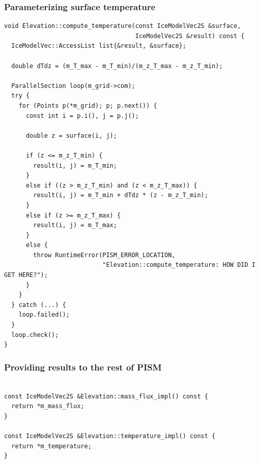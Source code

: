 \documentclass[hide notes,intlimits]{beamer}
\begin{document}
\begin{frame}[fragile]
  \frametitle{Parameterizing surface temperature}
\begin{lstlisting}
void Elevation::compute_temperature(const IceModelVec2S &surface,
                                    IceModelVec2S &result) const {
  IceModelVec::AccessList list{&result, &surface};

  double dTdz = (m_T_max - m_T_min)/(m_z_T_max - m_z_T_min);

  ParallelSection loop(m_grid->com);
  try {
    for (Points p(*m_grid); p; p.next()) {
      const int i = p.i(), j = p.j();

      double z = surface(i, j);

      if (z <= m_z_T_min) {
        result(i, j) = m_T_min;
      }
      else if ((z > m_z_T_min) and (z < m_z_T_max)) {
        result(i, j) = m_T_min + dTdz * (z - m_z_T_min);
      }
      else if (z >= m_z_T_max) {
        result(i, j) = m_T_max;
      }
      else {
        throw RuntimeError(PISM_ERROR_LOCATION,
                           "Elevation::compute_temperature: HOW DID I GET HERE?");
      }
    }
  } catch (...) {
    loop.failed();
  }
  loop.check();
}

\end{lstlisting}
\end{frame}

\begin{frame}[fragile]
  \frametitle{Providing results to the rest of PISM}
\begin{lstlisting}

const IceModelVec2S &Elevation::mass_flux_impl() const {
  return *m_mass_flux;
}

const IceModelVec2S &Elevation::temperature_impl() const {
  return *m_temperature;
}

\end{lstlisting}
\end{frame}
\end{document}
